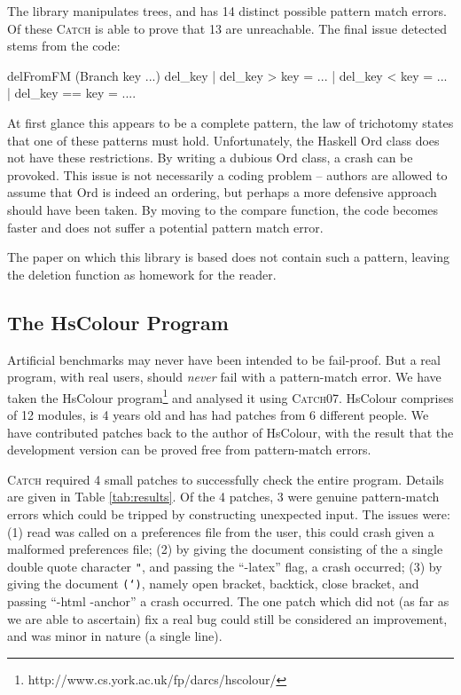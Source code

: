 \documentclass[preprint]{sigplanconf}
\newcommand{\T}[1]{\texttt{#1}}
\newcommand{\C}[1]{\textsf{#1}}
\newcommand{\catch}{\textsc{Catch}}
\begin{document}
The library manipulates trees, and has 14 distinct possible pattern match errors. Of these \catch{} is able to prove that 13 are unreachable. The final issue detected stems from the code:

\begin{code}
delFromFM (Branch key ...) del_key  | del_key  >   key = ...
                                    | del_key  <   key = ...
                                    | del_key  ==  key = ....
\end{code}

At first glance this appears to be a complete pattern, the law of trichotomy states that one of these patterns must hold. Unfortunately, the Haskell \C{Ord} class does not have these restrictions. By writing a dubious \C{Ord} class, a crash can be provoked. This issue is not necessarily a coding problem -- authors are allowed to assume that \C{Ord} is indeed an ordering, but perhaps a more defensive approach should have been taken. By moving to the \C{compare} function, the code becomes faster and does not suffer a potential pattern match error.

The paper on which this library is based does not contain such a pattern, leaving the deletion function as homework for the reader.


\subsection{The HsColour Program}
\label{sec:hscolour}

Artificial benchmarks may never have been intended to be fail-proof. But a real program, with real users, should \textit{never} fail with a pattern-match error. We have taken the HsColour program\footnote{http://www.cs.york.ac.uk/fp/darcs/hscolour/} and analysed it using \catch07. HsColour comprises of 12 modules, is 4 years old and has had patches from 6 different people.
We have contributed patches back to the author of HsColour, with the result that the development version can be proved free from pattern-match errors.

\catch{} required 4 small patches to successfully check the entire program. Details are given in Table \ref{tab:results}. Of the 4 patches, 3 were genuine pattern-match errors which could be tripped by constructing unexpected input. The issues were: (1) \C{read} was called on a preferences file from the user, this could crash given a malformed preferences file; (2) by giving the document consisting of the a single double quote character \T{"}, and passing the ``-latex'' flag, a crash occurred; (3) by giving the document \T{(`)}, namely open bracket, backtick, close bracket, and passing ``-html -anchor'' a crash occurred. The one patch which did not (as far as we are able to ascertain) fix a real bug could still be considered an improvement, and was minor in nature (a single line).
\end{document}

